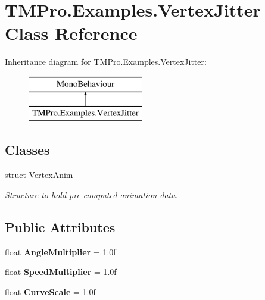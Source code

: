 \hypertarget{class_t_m_pro_1_1_examples_1_1_vertex_jitter}{}\section{T\+M\+Pro.\+Examples.\+Vertex\+Jitter Class Reference}
\label{class_t_m_pro_1_1_examples_1_1_vertex_jitter}
Inheritance diagram for T\+M\+Pro.\+Examples.\+Vertex\+Jitter\+:\begin{figure}[H]
\begin{center}
\leavevmode
\includegraphics[height=2.000000cm]{class_t_m_pro_1_1_examples_1_1_vertex_jitter}
\end{center}
\end{figure}
\subsection*{Classes}
\begin{DoxyCompactItemize}
\item 
struct \hyperlink{struct_t_m_pro_1_1_examples_1_1_vertex_jitter_1_1_vertex_anim}{Vertex\+Anim}
\begin{DoxyCompactList}\small\item\em Structure to hold pre-\/computed animation data. \end{DoxyCompactList}\end{DoxyCompactItemize}
\subsection*{Public Attributes}
\begin{DoxyCompactItemize}
\item 
\mbox{\label{class_t_m_pro_1_1_examples_1_1_vertex_jitter_a48aa2f5018ce1f57c68b316cfc5a76d0}} 
float {\bfseries Angle\+Multiplier} = 1.\+0f
\item 
\mbox{\label{class_t_m_pro_1_1_examples_1_1_vertex_jitter_a5470bb01ad13ec8b9dab328468bc454d}} 
float {\bfseries Speed\+Multiplier} = 1.\+0f
\item 
\mbox{\label{class_t_m_pro_1_1_examples_1_1_vertex_jitter_a2950cda059be7e08282d0caee720df49}} 
float {\bfseries Curve\+Scale} = 1.\+0f
\end{DoxyCompactItemize}
